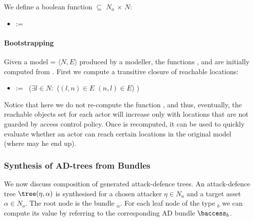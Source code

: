 \documentclass{llncs}
\begin{document}
\begin{definition}[\Accessible{}{}]
We define a boolean function \Accessible{}{} $\subseteq$ $N_a$ $\times$ $N$:
\begin{itemize}
\item {} :=  \AND\ 
\end{itemize}

	
\end{definition}



\paragraph{Bootstrapping}
Given a model \model= $\langle N,E \rangle$ produced by a modeller, the functions \Reachable{}{}, \Granted{}{} and \Accessible{}{} are initially computed from \model. First we compute a transitive closure of reachable locations:
\begin{itemize}
\item {} 	:=  \OR\ ($\exists l \in N:$  \AND ($(l,n) \in E$ \OR $(n,l) \in E$) )
\end{itemize}
Notice that here we do not re-compute the function \Granted{}{}, and thus, eventually, the reachable objects set for each actor will increase only with locations that are not guarded by access control policy. Once \Reachable{}{} is recomputed, it can be used to quickly evaluate whether an actor can reach certain locations in the original model (where may he end up). 



\subsubsection{Synthesis of AD-trees from Bundles}

We now discuss composition of generated attack-defence trees. An attack-defence tree $\tree(\eta,\alpha)$ is synthesised for a chosen attacker $\eta \in N_a$ and a target asset $\alpha \in N_o$. The root node is the bundle \taccess$_\alpha$. For each leaf node of the type \taccess$_b$ we can compute its value by referring to the corresponding AD bundle $\baccess_b$. 
\end{document}
